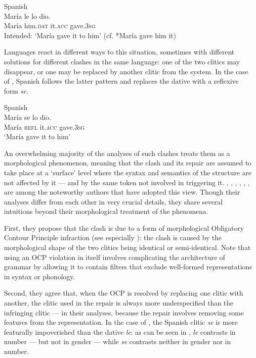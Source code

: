 \documentclass[output=paper,modfonts,nonflat,newtxmath,colorlinks,citecolor=brown]{langsci/langscibook}
\begin{document}
\ea %
    \label{ex:cabre:1}
    Spanish\\
    \gll * María le lo dio.  \\
        { } {María} {him.\textsc{dat}}  it.\textsc{acc}  gave.\textsc{3sg}\\   
         \glt { } Intended: ‘María gave it to him’ (cf. *{María} {gave} {him} {it})
    \z 

          
Languages react in different ways to this situation, sometimes with different solutions for different clashes in the same language: one of the two clitics may disappear, or one may be replaced by another clitic from the system. In the case of , Spanish follows the latter pattern and replaces the dative with a reflexive form \textit{se}.

\ea%
    \label{ex:cabre:2}
     Spanish \\
    \gll María  se  lo    dio.\\
        {María}  \textsc{refl}  it.\textsc{acc}  gave.3\textsc{sg}\\
    \glt ‘María gave it to him’
    \z

  

 An overwhelming majority of the analyses of such clashes treats them as a morphological phenomenon, meaning that the clash and its repair are assumed to take place at a ‘surface’ level where the syntax and semantics of the structure are not affected by it — and by the same token not involved in triggering it. \citet{Perlmutter1971}, \citet{Bonet1991}, \citet{Bonet1993}, \citet{Bonet1995}, \citet{Grimshaw1997}, \citet{Pescarini2007}, \citet{Nevins2012} are among the noteworthy authors that have adopted this view. Though their analyses differ from each other in very crucial details, they share several intuitions beyond their morphological treatment of the phenomena. 

First, they propose that the clash is due to a form of morphological Obligatory Contour Principle infraction (see especially \citealt{Nevins2012}): the clash is caused by the morphological shape of the two clitics being identical or semi-identical. Note that using an OCP violation in itself involves complicating the architecture of grammar by allowing it to contain filters that exclude well-formed representations in syntax or phonology.

Second, they agree that, when the OCP is resolved by replacing one clitic with another, the clitic used in the repair is always more underspecified than the infringing clitic — in their analyses, because the repair involves removing some features from the representation. In the case of , the Spanish clitic \textit{se} is more featurally impoverished than the dative \textit{le}: as can be seen in , \textit{le} contrasts in number — but not in gender — while \textit{se} contrasts neither in gender nor in number.
\end{document}
